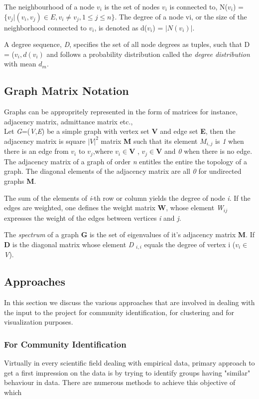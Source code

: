 The neighbourhood of a node $v_i$ is the set of
nodes $v_i$ is connected to, N($v_i$) = $\{v_j | (v_i, v_j) \in E, v_i \neq
v_j, 1 \leq j \leq n\}$. The degree of a node vi, or the size of
the neighborhood connected to $v_i$, is denoted as d($v_i$) =
$|N(v_i)|$. 
\par A degree sequence, \textit{D}, specifies the set of all node
degrees as tuples, such that D = {($v_i, d(v_i)$} and follows a
probability distribution called the \textit{degree distribution} with
mean $d_m$. \cite{githubtest1}

\subsection{Graph Matrix Notation}
Graphs can be appropritely represented in the form of matrices for instance, adjacency matrix, admittance matrix etc.,
\\
Let \textit{G}=(\textit{V},\textit{E}) be a simple graph with vertex set \textbf{V} and edge set \textbf{E}, then the adjacency matrix is square $|V|^2$ matrix \textbf{M} such that its element $M_{i,j}$ is \textit{1} when there is an edge from $v_i$ to $v_j$,where $v_i \in \textbf{V}$ , $ v_j \in \textbf{V}$ and \textit{0} when there is no edge.
The adjacency matrix of a graph of order \textit{n} entitles the entire the topology of a graph.  The diagonal elements of the adjacency matrix are all \textit{0} for undirected graphs \textbf{M}.
\par The sum of the elements of \textit{i}-th row or column yields the degree of node \textit{i}. If the edges are weighted, one defines the weight matrix \textbf{W}, whose element \textit{W}$_{ij}$ expresses the weight of the edges between vertices \textit{i} and \textit{j}.

\par The \textit{spectrum} of a graph \textbf{G} is the set of eigenvalues of it's adjacency matrix \textbf{M}. If \textbf{D}  is the diagonal matrix whose element \textit{D} $_{i,i}$ equals the degree of vertex i ($v_i \in$ \textit{V}).

\subsection{Approaches}
In this section we discuss the various approaches that are involved in dealing with the input to the project for community identification, for clustering and for visualization purposes. 
\subsubsection{For Community Identification}
Virtually in every scientific field dealing with empirical data, primary approach to get a first impression on the data is by trying to identify groups having "similar" behaviour in data. There are numerous methods to achieve this objective of which 

